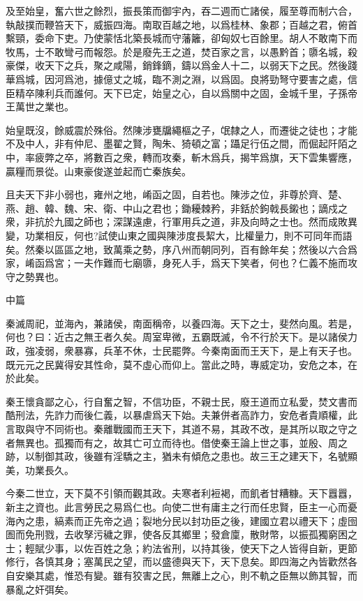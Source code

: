 \documentclass[12pt,a4paper]{ctexbook}
\begin{document}
及至始皇，奮六世之餘烈，振長策而御宇內，吞二週而亡諸侯，履至尊而制六合，執敲撲而鞭笞天下，威振四海。南取百越之地，以爲桂林、象郡；百越之君，俯首繫頸，委命下吏。乃使蒙恬北築長城而守藩籬，卻匈奴七百餘里。胡人不敢南下而牧馬，士不敢彎弓而報怨。於是廢先王之道，焚百家之言，以愚黔首；隳名城，殺豪傑，收天下之兵，聚之咸陽，銷鋒鏑，鑄以爲金人十二，以弱天下之民。然後踐華爲城，因河爲池，據億丈之城，臨不測之淵，以爲固。良將勁弩守要害之處，信臣精卒陳利兵而誰何。天下已定，始皇之心，自以爲關中之固，金城千里，子孫帝王萬世之業也。\par
始皇既沒，餘威震於殊俗。然陳涉甕牖繩樞之子，氓隸之人，而遷徙之徒也；才能不及中人，非有仲尼、墨翟之賢，陶朱、猗頓之富；躡足行伍之間，而倔起阡陌之中，率疲弊之卒，將數百之衆，轉而攻秦，斬木爲兵，揭竿爲旗，天下雲集響應，贏糧而景從。山東豪俊遂並起而亡秦族矣。\par
且夫天下非小弱也，雍州之地，崤函之固，自若也。陳涉之位，非尊於齊、楚、燕、趙、韓、魏、宋、衛、中山之君也；鋤耰棘矜，非銛於鉤戟長鎩也；謫戍之衆，非抗於九國之師也；深謀遠慮，行軍用兵之道，非及向時之士也。然而成敗異變，功業相反，何也?試使山東之國與陳涉度長絜大，比權量力，則不可同年而語矣。然秦以區區之地，致萬乘之勢，序八州而朝同列，百有餘年矣；然後以六合爲家，崤函爲宮；一夫作難而七廟隳，身死人手，爲天下笑者，何也？仁義不施而攻守之勢異也。\par
中篇\par
秦滅周祀，並海內，兼諸侯，南面稱帝，以養四海。天下之士，斐然向風。若是，何也？曰：近古之無王者久矣。周室卑微，五霸既滅，令不行於天下。是以諸侯力政，強凌弱，衆暴寡，兵革不休，士民罷弊。今秦南面而王天下，是上有天子也。既元元之民冀得安其性命，莫不虛心而仰上。當此之時，專威定功，安危之本，在於此矣。\par
秦王懷貪鄙之心，行自奮之智，不信功臣，不親士民，廢王道而立私愛，焚文書而酷刑法，先詐力而後仁義，以暴虐爲天下始。夫兼併者高詐力，安危者貴順權，此言取與守不同術也。秦離戰國而王天下，其道不易，其政不改，是其所以取之守之者無異也。孤獨而有之，故其亡可立而待也。借使秦王論上世之事，並殷、周之跡，以制御其政，後雖有淫驕之主，猶未有傾危之患也。故三王之建天下，名號顯美，功業長久。\par
今秦二世立，天下莫不引領而觀其政。夫寒者利裋褐，而飢者甘糟糠。天下囂囂，新主之資也。此言勞民之易爲仁也。向使二世有庸主之行而任忠賢，臣主一心而憂海內之患，縞素而正先帝之過；裂地分民以封功臣之後，建國立君以禮天下；虛囹圄而免刑戮，去收孥污穢之罪，使各反其鄉里；發倉廩，散財幣，以振孤獨窮困之士；輕賦少事，以佐百姓之急；約法省刑，以持其後，使天下之人皆得自新，更節修行，各慎其身；塞萬民之望，而以盛德與天下，天下息矣。即四海之內皆歡然各自安樂其處，惟恐有變。雖有狡害之民，無離上之心，則不軌之臣無以飾其智，而暴亂之奸弭矣。\par
\end{document}
